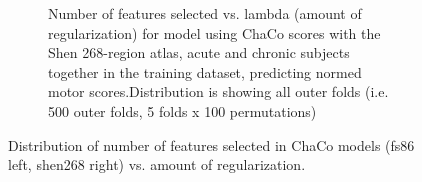 \documentclass[10pt]{article}
\begin{document}
\begin{figure}
\begin{subfigure}{0.5\textwidth}
  \caption{Number of features selected vs. lambda (amount of regularization) for model using ChaCo scores with the Shen 268-region atlas, acute and chronic subjects together in the training dataset, predicting normed motor scores.Distribution is showing all outer folds (i.e. 500 outer folds, 5 folds x 100 permutations)} 
  \label{fig:sfig2}
\end{subfigure}
\caption{Distribution of number of features selected in ChaCo models (fs86 left, shen268 right) vs. amount of regularization.}
\label{lambda_kappa}
\end{figure}
\end{document}
